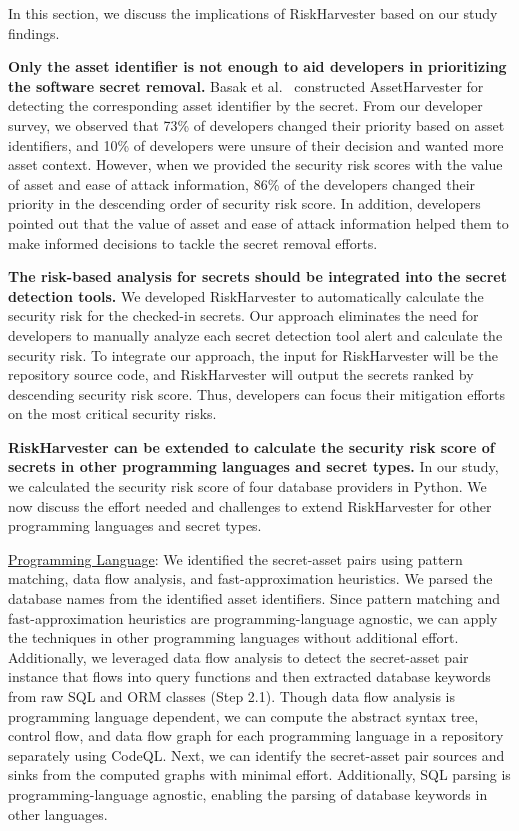 In this section, we discuss the implications of RiskHarvester based on our study findings.

\textbf{Only the asset identifier is not enough to aid developers in prioritizing the software secret removal.} Basak et al.~\cite{assetharvester} constructed AssetHarvester for detecting the corresponding asset identifier by the secret. From our developer survey, we observed that 73\% of developers changed their priority based on asset identifiers, and 10\% of developers were unsure of their decision and wanted more asset context. However, when we provided the security risk scores with the value of asset and ease of attack information, 86\% of the developers changed their priority in the descending order of security risk score. In addition, developers pointed out that the value of asset and ease of attack information helped them to make informed decisions to tackle the secret removal efforts.


\textbf{The risk-based analysis for secrets should be integrated into the secret detection tools.} We developed RiskHarvester to automatically calculate the security risk for the checked-in secrets. Our approach eliminates the need for developers to manually analyze each secret detection tool alert and calculate the security risk. To integrate our approach, the input for RiskHarvester will be the repository source code, and RiskHarvester will output the secrets ranked by descending security risk score. Thus, developers can focus their mitigation efforts on the most critical security risks. 


\textbf{RiskHarvester can be extended to calculate the security risk score of secrets in other programming languages and secret types.} In our study, we calculated the security risk score of four database providers in Python. We now discuss the effort needed and challenges to extend RiskHarvester for other programming languages and secret types.

\uline{Programming Language}: We identified the secret-asset pairs using pattern matching, data flow analysis, and fast-approximation heuristics. We parsed the database names from the identified asset identifiers. Since pattern matching and fast-approximation heuristics are programming-language agnostic, we can apply the techniques in other programming languages without additional effort. Additionally, we leveraged data flow analysis to detect the secret-asset pair instance that flows into query functions and then extracted database keywords from raw SQL and ORM classes (Step 2.1). Though data flow analysis is programming language dependent, we can compute the abstract syntax tree, control flow, and data flow graph for each programming language in a repository separately using CodeQL. Next, we can identify the secret-asset pair sources and sinks from the computed graphs with minimal effort. Additionally, SQL parsing is programming-language agnostic, enabling the parsing of database keywords in other languages.

